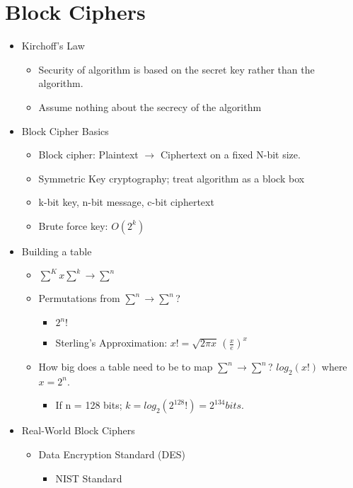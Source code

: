 \section{Block Ciphers}
\begin{itemize}
\item Kirchoff's Law
    \begin{itemize}
    \item Security of algorithm is based on the secret key rather than the algorithm.
    \item Assume nothing about the secrecy of the algorithm
    \end{itemize}
\item Block Cipher Basics
    \begin{itemize}
    \item Block cipher: Plaintext $\rightarrow$ Ciphertext on a fixed N-bit size. 
    \item Symmetric Key cryptography; treat algorithm as a block box
    \item k-bit key, n-bit message, c-bit ciphertext
    \item Brute force key: $O(2^k)$
    \end{itemize}
\item Building a table
    \begin{itemize}
    \item $\sum^K x \sum^k \rightarrow \sum^n$
    \item Permutations from $\sum^n \rightarrow \sum^n$?
        \begin{itemize}
        \item $2^n!$
        \item Sterling's Approximation: $x! = \sqrt{2\pi x}\,(\frac{x}{e})^x $
        \end{itemize}
    \item How big does a table need to be to map $\sum^n \rightarrow \sum^n$? $log_2(x!)$ where $x = 2^n$.
        \begin{itemize}
        \item If n = 128 bits; $k = log_2(2^{128}!) = 2^{134} bits.$
        \end{itemize}
    \end{itemize}
\item Real-World Block Ciphers
\begin{itemize}
    \item Data Encryption Standard (DES)
        \begin{itemize}
        \item NIST Standard

\end{itemize}
\end{itemize}
\end{itemize}
